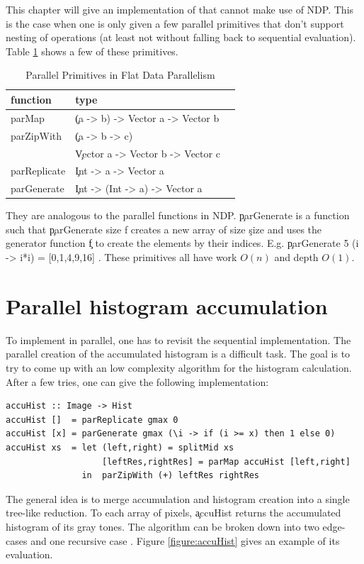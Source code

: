 

This chapter will give an implementation of \algo
that cannot make use of NDP. This is
the case when one is only given a few parallel primitives
that don't support nesting
of operations (at least not without falling back to sequential evaluation).
Table \ref{table:parprims} shows a few of these primitives.

  \begin{table}[h!]
    \caption{Parallel Primitives in Flat Data Parallelism}
    \label{table:parprims}
    \begin{center}
    \begin{tabular}{lll}
      \toprule
      function & type \\
      \midrule
      parMap & \c{(a -> b) -> Vector a -> Vector b} \\
      parZipWith & \c{(a -> b -> c)} \\
       & \c{Vector a -> Vector b -> Vector c} \\
      parReplicate & \c{Int -> a -> Vector a} \\
      parGenerate & \c{Int -> (Int -> a) -> Vector a} \\
    \end{tabular}
    \end{center}
  \end{table}
  They are analogous to the parallel functions in NDP.
  \c{parGenerate} is a function such that \c{parGenerate size f} creates a new array
  of size \c{size} and uses the generator function \c{f} to create
  the elements by their indices.
  E.g. \c{parGenerate 5 (\lam i -> i*i) = [0,1,4,9,16] }.
  These primitives all have work $O(n)$ and depth $O(1)$.
  
\section{Parallel histogram accumulation}
  To implement \algo in parallel, one has to revisit the sequential
  implementation. The parallel creation of the accumulated histogram is
  a difficult task. The goal is to try to come up with
  an low complexity algorithm for the histogram calculation.
  After a few tries, one can give the following implementation:
  
  \begin{lstlisting}
accuHist :: Image -> Hist
accuHist []  = parReplicate gmax 0
accuHist [x] = parGenerate gmax (\i -> if (i >= x) then 1 else 0)
accuHist xs  = let (left,right) = splitMid xs
                   [leftRes,rightRes] = parMap accuHist [left,right]
               in  parZipWith (+) leftRes rightRes
  \end{lstlisting}
  The general idea is to merge accumulation and histogram creation
  into a single tree-like reduction. To each array of pixels, \c{accuHist}
  returns the accumulated histogram of its gray tones.
  The algorithm can be broken down into two edge-cases and one recursive case
  . Figure \ref{figure:accuHist} gives an example of its evaluation.
  
